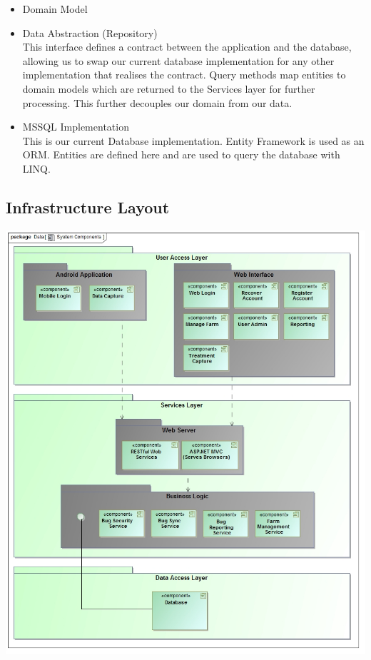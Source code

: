\documentclass[11pt,a4paper,titlepage]{article}
\begin{document}
\begin{itemize}
				    \begin{itemize}
						\item Domain Model						
						\item Data Abstraction (Repository)\\
						This interface defines a contract between the application and the database, allowing us to swap our current database implementation for any other implementation that realises the contract. Query methods map entities to domain models which are returned to the Services layer for further processing. This further decouples our domain from our data.
						\item MSSQL Implementation\\
						This is our current Database implementation. Entity Framework is used as an ORM. Entities are defined here and are used to query the database with LINQ.						
					\end{itemize}
			\end{itemize}
	\subsection{Infrastructure Layout}
		\includegraphics[width=\linewidth]{SystemComponents}	
\end{document}
